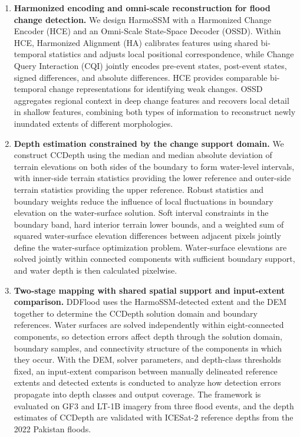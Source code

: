 \documentclass[authoryear,preprint,12pt]{elsarticle}
\begin{document}
\begin{enumerate}
  \item \textbf{Harmonized encoding and omni-scale reconstruction for flood change detection.} We design HarmoSSM with a Harmonized Change Encoder (HCE) and an Omni-Scale State-Space Decoder (OSSD). Within HCE, Harmonized Alignment (HA) calibrates features using shared bi-temporal statistics and adjusts local positional correspondence, while Change Query Interaction (CQI) jointly encodes pre-event states, post-event states, signed differences, and absolute differences. HCE provides comparable bi-temporal change representations for identifying weak changes. OSSD aggregates regional context in deep change features and recovers local detail in shallow features, combining both types of information to reconstruct newly inundated extents of different morphologies.

  \item \textbf{Depth estimation constrained by the change support domain.} We construct CCDepth using the median and median absolute deviation of terrain elevations on both sides of the boundary to form water-level intervals, with inner-side terrain statistics providing the lower reference and outer-side terrain statistics providing the upper reference. Robust statistics and boundary weights reduce the influence of local fluctuations in boundary elevation on the water-surface solution. Soft interval constraints in the boundary band, hard interior terrain lower bounds, and a weighted sum of squared water-surface elevation differences between adjacent pixels jointly define the water-surface optimization problem. Water-surface elevations are solved jointly within connected components with sufficient boundary support, and water depth is then calculated pixelwise.

  \item \textbf{Two-stage mapping with shared spatial support and input-extent comparison.} DDFlood uses the HarmoSSM-detected extent and the DEM together to determine the CCDepth solution domain and boundary references. Water surfaces are solved independently within eight-connected components, so detection errors affect depth through the solution domain, boundary samples, and connectivity structure of the components in which they occur. With the DEM, solver parameters, and depth-class thresholds fixed, an input-extent comparison between manually delineated reference extents and detected extents is conducted to analyze how detection errors propagate into depth classes and output coverage. The framework is evaluated on GF3 and LT-1B imagery from three flood events, and the depth estimates of CCDepth are validated with ICESat-2 reference depths from the 2022 Pakistan floods.
\end{enumerate}
\end{document}

